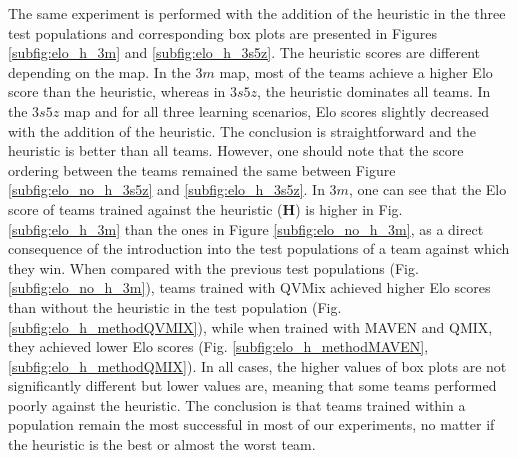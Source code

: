 The same experiment is performed with the addition of the heuristic in the three test populations and corresponding box plots are presented in Figures \ref{subfig:elo_h_3m} and \ref{subfig:elo_h_3s5z}.
The heuristic scores are different depending on the map.
In the $3m$ map, most of the teams achieve a higher Elo score than the heuristic, whereas in $3s5z$, the heuristic dominates all teams.
In the $3s5z$ map and for all three learning scenarios, Elo scores slightly decreased with the addition of the heuristic.
The conclusion is straightforward and the heuristic is better than all teams.
However, one should note that the score ordering between the teams remained the same between Figure \ref{subfig:elo_no_h_3s5z} and \ref{subfig:elo_h_3s5z}.
In $3m$, one can see that the Elo score of teams trained against the heuristic (\textbf{H}) is higher in Fig. \ref{subfig:elo_h_3m} than the ones in Figure \ref{subfig:elo_no_h_3m}, as a direct consequence of the introduction into the test populations of a team against which they win.
When compared with the previous test populations (Fig. \ref{subfig:elo_no_h_3m}), teams trained with QVMix achieved higher Elo scores than without the heuristic in the test population (Fig. \ref{subfig:elo_h_methodQVMIX}), while when trained with MAVEN and QMIX, they achieved lower Elo scores (Fig. \ref{subfig:elo_h_methodMAVEN}, \ref{subfig:elo_h_methodQMIX}).
In all cases, the higher values of box plots are not significantly different but lower values are, meaning that some teams performed poorly against the heuristic.
The conclusion is that teams trained within a population remain the most successful in most of our experiments, no matter if the heuristic is the best or almost the worst team.

\begin{figure}
    
\end{figure}


